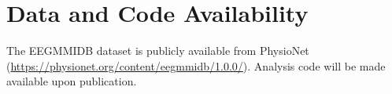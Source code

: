 \documentclass[11pt,a4paper]{article}
\begin{document}
\section*{Data and Code Availability}

The EEGMMIDB dataset is publicly available from PhysioNet (\url{https://physionet.org/content/eegmmidb/1.0.0/}). Analysis code will be made available upon publication.

\printbibliography
\end{document}
